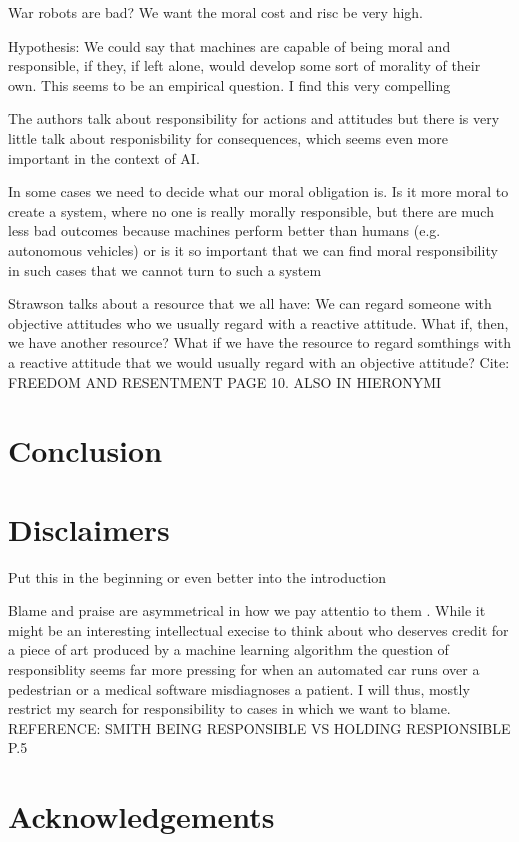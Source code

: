 \documentclass{article}
\begin{document}
War robots are bad? We want the moral cost and risc be very high.

Hypothesis: We could say that machines are capable of being moral and
responsible, if they, if left alone, would develop some sort of morality of
their own. This seems to be an empirical question. I find this very compelling

The authors talk about responsibility for actions and attitudes but there is
very little talk about responisbility for consequences, which seems even more
important in the context of AI.

In some cases we need to decide what our moral obligation is. Is it more moral
to create a system, where no one is really morally responsible, but there are
much less bad outcomes because machines perform better than humans (e.g.
autonomous vehicles) or is it so important that we can find moral responsibility
in such cases that we cannot turn to such a system

Strawson talks about a resource that we all have: We can regard someone with
objective attitudes who we usually regard with a reactive attitude. What if,
then, we have another resource? What if we have the resource to regard somthings
with a reactive attitude that we would usually regard with an objective
attitude? Cite: FREEDOM AND RESENTMENT PAGE 10. ALSO IN HIERONYMI
\section{Conclusion}
\section{Disclaimers}
Put this in the beginning or even better into the introduction

Blame and praise are asymmetrical in how we pay attentio to them . While it
might be an interesting intellectual execise to think about who deserves credit
for a piece of art produced by a machine learning algorithm the question of
responsiblity seems far more pressing for when an automated car runs over a
pedestrian or a medical software misdiagnoses a patient. I will thus, mostly
restrict my search for responsibility to cases in which we want to blame.
REFERENCE: SMITH BEING RESPONSIBLE VS HOLDING RESPIONSIBLE P.5
\section{Acknowledgements}
\clearpage

\printglossary[type=\acronymtype]
\printglossary
\printbibliography
\end{document}
